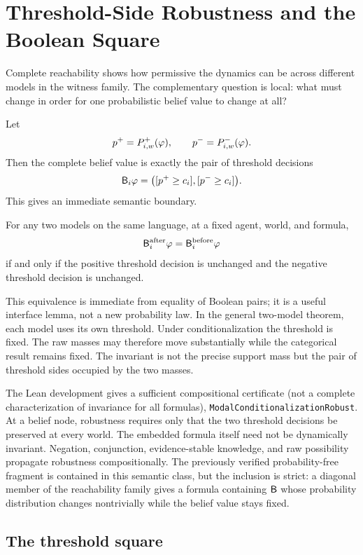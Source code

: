 \section{Threshold-Side Robustness and the Boolean Square}
\label{sec:square}

Complete reachability shows how permissive the dynamics can be across different models in the witness family. The complementary question is local: what must change in order for one probabilistic belief value to change at all?

Let
\[
  p^+=P^{+}_{i,w}(\varphi),
  \qquad
  p^-=P^{-}_{i,w}(\varphi).
\]
Then the complete belief value is exactly the pair of threshold decisions
\[
  \mathsf{B}_i\varphi
  =\bigl([p^+\ge c_i],[p^-\ge c_i]\bigr).
\]
This gives an immediate semantic boundary.

\begin{theorem}
For any two models on the same language, at a fixed agent, world, and formula,
\[
  \mathsf{B}_i^{\mathrm{after}}\varphi
  =\mathsf{B}_i^{\mathrm{before}}\varphi
\]
if and only if the positive threshold decision is unchanged and the negative threshold decision is unchanged.
\statusverified
\end{theorem}

This equivalence is immediate from equality of Boolean pairs; it is a useful interface lemma, not a new probability law. In the general two-model theorem, each model uses its own threshold. Under conditionalization the threshold is fixed. The raw masses may therefore move substantially while the categorical result remains fixed. The invariant is not the precise support mass but the pair of threshold sides occupied by the two masses.

The Lean development gives a sufficient compositional certificate (not a complete characterization of invariance for all formulas), \texttt{ModalConditionalizationRobust}. At a belief node, robustness requires only that the two threshold decisions be preserved at every world. The embedded formula itself need not be dynamically invariant. Negation, conjunction, evidence-stable knowledge, and raw possibility propagate robustness compositionally. The previously verified probability-free fragment is contained in this semantic class, but the inclusion is strict: a diagonal member of the reachability family gives a formula containing \(\mathsf{B}\) whose probability distribution changes nontrivially while the belief value stays fixed.

\subsection{The threshold square}

